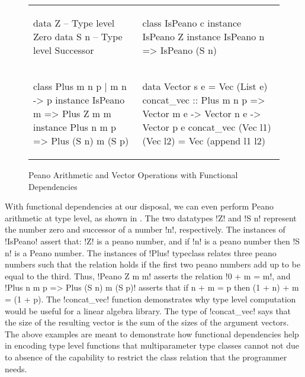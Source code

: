 \documentclass[format=acmsmall,manuscript,review,screen,nonacm,margin=1in,11pt]{acmart}
\begin{document}
\begin{figure}[ht]
  \footnotesize
  \begin{tabular}{l l}
\begin{code}
data Z   -- Type level Zero
data S n -- Type level Successor
\end{code}&%
\begin{code}
class IsPeano c
instance IsPeano Z
instance IsPeano n => IsPeano (S n)
\end{code}\\
\begin{code}
class Plus m n p | m n -> p
instance IsPeano m => Plus Z m m
instance Plus n m p => Plus (S n) m (S p)
\end{code}&%
\begin{code}
data Vector s e = Vec (List e)
concat_vec :: Plus m n p
     => Vector m e -> Vector n e -> Vector p e
concat_vec (Vec l1) (Vec l2)
     = Vec (append l1 l2)
\end{code}
  \end{tabular}
  \caption{Peano Arithmetic and Vector Operations with Functional Dependencies}
  \label{fig:peano-arith}
\end{figure}

With functional dependencies at our disposal, we can even perform Peano arithmetic at type level,
as shown in . The two datatypes !Z! and !S n!
represent the number zero and successor of a number !n!, respectively.
The instances of !IsPeano! assert that: !Z! is a peano number, and if !n! is a peano number
then !S n! is a Peano number. The instances of !Plus! typeclass relates three peano numbers such that the relation
holds if the first two peano numbers add up to be equal to the third. Thus, !Peano Z m m! asserts the relation
!0 + m = m!, and !Plus n m p => Plus (S n) m (S p)! asserts that if n + m = p then (1 + n) + m = (1 + p).
The !concat_vec! function demonstrates why type level computation would be useful
for a linear algebra library. The type of !concat_vec! says that the size of the resulting
vector is the sum of the sizes of the argument vectors.
The above examples are meant to demonstrate how functional dependencies help in encoding
type level functions that multiparameter type classes cannot not due to absence of the capability
to restrict the class relation that the programmer needs.
\end{document}
